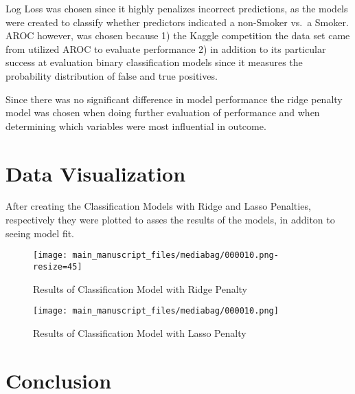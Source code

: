 \documentclass[
  12pt,
  letterpaper,
]{article}
\begin{document}
Log Loss was chosen since it highly penalizes incorrect predictions, as
the models were created to classify whether predictors indicated a
non-Smoker vs.~a Smoker. AROC however, was chosen because 1) the Kaggle
competition the data set came from utilized AROC to evaluate performance
2) in addition to its particular success at evaluation binary
classification models since it measures the probability distribution of
false and true positives.

Since there was no significant difference in model performance the ridge
penalty model was chosen when doing further evaluation of performance
and when determining which variables were most influential in outcome.

\hypertarget{data-visualization}{%
\section{Data Visualization}\label{data-visualization}}

After creating the Classification Models with Ridge and Lasso Penalties,
respectively they were plotted to asses the results of the models, in
additon to seeing model fit.

\begin{figure}[!t]

{\centering \texttt{[image: main\_manuscript\_files/mediabag/000010.png-resize=45]}

}

\caption{Results of Classification Model with Ridge Penalty}

\end{figure}

\begin{figure}[!t]

{\centering \texttt{[image: main\_manuscript\_files/mediabag/000010.png]}

}

\caption{Results of Classification Model with Lasso Penalty}

\end{figure}

\hypertarget{conclusion}{%
\section{Conclusion}\label{conclusion}}
\end{document}
